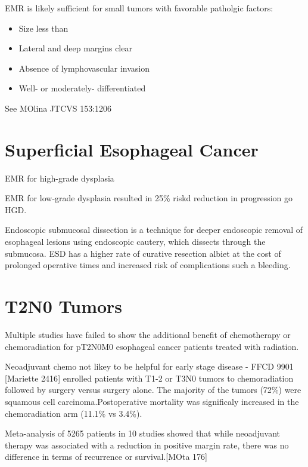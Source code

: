 \documentclass[
]{book}
\providecommand{\tightlist}{%
  \setlength{\itemsep}{0pt}\setlength{\parskip}{0pt}}
\begin{document}
EMR is likely sufficient for small tumors with favorable patholgic factors:

\begin{itemize}
\tightlist
\item
  Size less than
\item
  Lateral and deep margins clear
\item
  Absence of lymphovascular invasion
\item
  Well- or moderately- differentiated
\end{itemize}

See MOlina JTCVS 153:1206

\hypertarget{superficial-esophageal-cancer}{%
\chapter{Superficial Esophageal Cancer}\label{superficial-esophageal-cancer}}

EMR for high-grade dysplasia \citep{shaheen2277}

EMR for low-grade dysplasia \citep{phoa1209} resulted in 25\% riskd reduction in progression go HGD.

Endoscopic submucosal dissection is a technique for deeper endoscopic removal of esophageal lesions using endoscopic cautery, which dissects through the submucosa. ESD has a higher rate of curative resection \citep{cao751} albiet at the cost of prolonged operative times and increased risk of complications such a bleeding.

\hypertarget{t2n0-tumors}{%
\chapter{T2N0 Tumors}\label{t2n0-tumors}}

Multiple studies have failed to show the additional benefit of chemotherapy or chemoradiation for pT2N0M0 esophageal cancer patients treated with radiation.

Neoadjuvant chemo not likey to be helpful for early stage disease - FFCD 9901 {[}Mariette 2416{]} enrolled patients with T1-2 or T3N0 tumors to chemoradiation followed by surgery versus surgery alone. The majority of the tumors (72\%) were squamous cell carcinoma.Postoperative mortality was significaly increased in the chemoradiation arm (11.1\% vs 3.4\%).

Meta-analysis of 5265 patients in 10 studies showed that while neoadjuvant therapy was associated with a reduction in positive margin rate, there was no difference in terms of recurrence or survival.{[}MOta 176{]}
\end{document}
